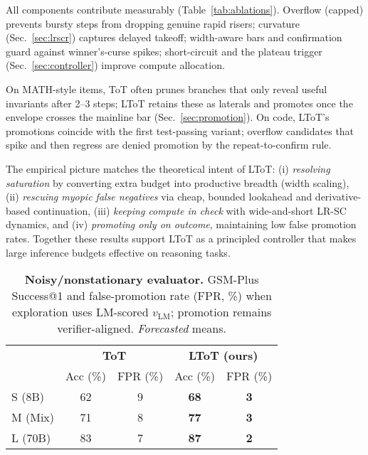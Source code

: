 \documentclass{article}
\begin{document}
All components contribute measurably (Table~\ref{tab:ablations}).
Overflow (capped) prevents bursty steps from dropping genuine rapid risers; curvature (Sec.~\ref{sec:lrscr}) captures delayed takeoff; width-aware bars and confirmation guard against winner's-curse spikes; short-circuit and the plateau trigger (Sec.~\ref{sec:controller}) improve compute allocation.

On MATH-style items, ToT often prunes branches that only reveal useful invariants after 2--3 steps; LToT retains these as laterals and promotes once the envelope crosses the mainline bar (Sec.~\ref{sec:promotion}).
On code, LToT's promotions coincide with the first test-passing variant; overflow candidates that spike and then regress are denied promotion by the repeat-to-confirm rule.

The empirical picture matches the theoretical intent of LToT:
(i) \emph{resolving saturation} by converting extra budget into productive breadth (width scaling),
(ii) \emph{rescuing myopic false negatives} via cheap, bounded lookahead and derivative-based continuation,
(iii) \emph{keeping compute in check} with wide-and-short LR-SC dynamics, and
(iv) \emph{promoting only on outcome}, maintaining low false promotion rates.
Together these results support LToT as a principled controller that makes large inference budgets effective on reasoning tasks.

\begin{table}[t]
\centering
\caption{\textbf{Noisy/nonstationary evaluator.} GSM-Plus Success@1 and false-promotion rate (FPR, \%) when exploration uses LM-scored $v_{\text{LM}}$; promotion remains verifier-aligned. \emph{Forecasted} means.}
\vspace{0.3em}
\begin{tabular}{lcccc}
\toprule
 & \multicolumn{2}{c}{\textbf{ToT}} & \multicolumn{2}{c}{\textbf{LToT (ours)}} \\
\cmidrule(lr){2-3}\cmidrule(lr){4-5}
 & Acc (\%) & FPR (\%) & Acc (\%) & FPR (\%) \\
\midrule
S (8B)  & 62 & 9  & \textbf{68} & \textbf{3} \\
M (Mix) & 71 & 8  & \textbf{77} & \textbf{3} \\
L (70B) & 83 & 7  & \textbf{87} & \textbf{2} \\
\bottomrule
\end{tabular}
\label{tab:noisy-gsm}
\end{table}
\end{document}

